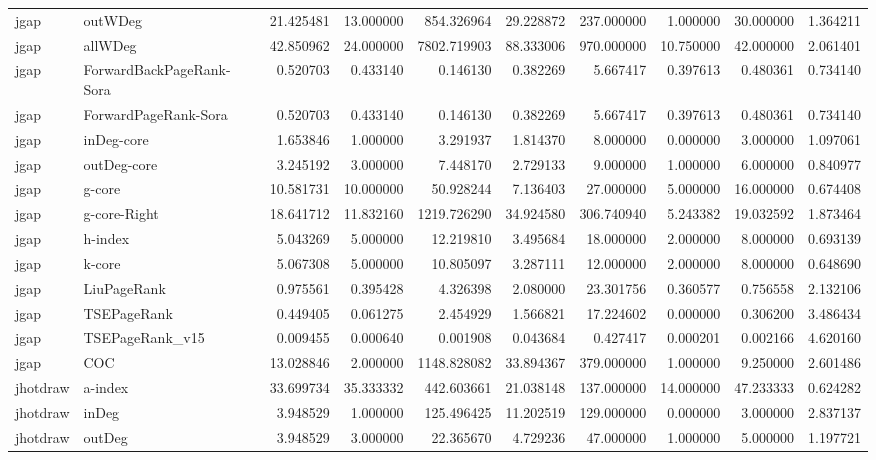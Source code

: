 \begin{tabular}{llrrrrrrrr}
jgap & outWDeg & 21.425481 & 13.000000 & 854.326964 & 29.228872 & 237.000000 & 1.000000 & 30.000000 & 1.364211 \\
jgap & allWDeg & 42.850962 & 24.000000 & 7802.719903 & 88.333006 & 970.000000 & 10.750000 & 42.000000 & 2.061401 \\
jgap & ForwardBackPageRank-Sora & 0.520703 & 0.433140 & 0.146130 & 0.382269 & 5.667417 & 0.397613 & 0.480361 & 0.734140 \\
jgap & ForwardPageRank-Sora & 0.520703 & 0.433140 & 0.146130 & 0.382269 & 5.667417 & 0.397613 & 0.480361 & 0.734140 \\
jgap & inDeg-core & 1.653846 & 1.000000 & 3.291937 & 1.814370 & 8.000000 & 0.000000 & 3.000000 & 1.097061 \\
jgap & outDeg-core & 3.245192 & 3.000000 & 7.448170 & 2.729133 & 9.000000 & 1.000000 & 6.000000 & 0.840977 \\
jgap & g-core & 10.581731 & 10.000000 & 50.928244 & 7.136403 & 27.000000 & 5.000000 & 16.000000 & 0.674408 \\
jgap & g-core-Right & 18.641712 & 11.832160 & 1219.726290 & 34.924580 & 306.740940 & 5.243382 & 19.032592 & 1.873464 \\
jgap & h-index & 5.043269 & 5.000000 & 12.219810 & 3.495684 & 18.000000 & 2.000000 & 8.000000 & 0.693139 \\
jgap & k-core & 5.067308 & 5.000000 & 10.805097 & 3.287111 & 12.000000 & 2.000000 & 8.000000 & 0.648690 \\
jgap & LiuPageRank & 0.975561 & 0.395428 & 4.326398 & 2.080000 & 23.301756 & 0.360577 & 0.756558 & 2.132106 \\
jgap & TSEPageRank & 0.449405 & 0.061275 & 2.454929 & 1.566821 & 17.224602 & 0.000000 & 0.306200 & 3.486434 \\
jgap & TSEPageRank_v15 & 0.009455 & 0.000640 & 0.001908 & 0.043684 & 0.427417 & 0.000201 & 0.002166 & 4.620160 \\
jgap & COC & 13.028846 & 2.000000 & 1148.828082 & 33.894367 & 379.000000 & 1.000000 & 9.250000 & 2.601486 \\
jhotdraw & a-index & 33.699734 & 35.333332 & 442.603661 & 21.038148 & 137.000000 & 14.000000 & 47.233333 & 0.624282 \\
jhotdraw & inDeg & 3.948529 & 1.000000 & 125.496425 & 11.202519 & 129.000000 & 0.000000 & 3.000000 & 2.837137 \\
jhotdraw & outDeg & 3.948529 & 3.000000 & 22.365670 & 4.729236 & 47.000000 & 1.000000 & 5.000000 & 1.197721 \\

\end{tabular}
